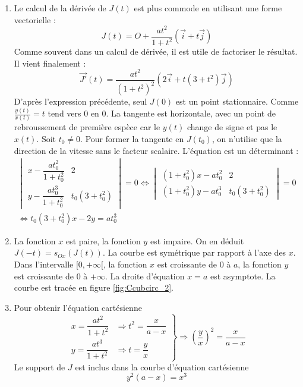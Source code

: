 \begin{enumerate}
\item Le calcul de la dérivée de $J(t)$ est plus commode en utilisant une forme vectorielle :
\begin{displaymath}
 J(t)=O + \dfrac{at^2}{1+t^2}\left( \overrightarrow{i}+t\overrightarrow{j}\right) 
\end{displaymath}
Comme souvent dans un calcul de dérivée, il est utile de factoriser le résultat. Il vient finalement :
\begin{displaymath}
 \overrightarrow{J'}(t)= \dfrac{at^2}{(1+t^2)^2}\left(2 \overrightarrow{i}+t(3+t^2)\overrightarrow{j}\right) 
\end{displaymath}
D'après l'expression précédente, seul $J(0)$ est un point stationnaire. Comme $\frac{y(t)}{x(t)}=t$ tend vers $0$ en $0$. La tangente est horizontale, avec un point de rebroussement de première espèce car le $y(t)$ change de signe et pas le $x(t)$.\newline
Soit $t_0\neq 0$. Pour former la tangente en $J(t_0)$, on n'utilise que la direction de la vitesse sans le facteur scalaire. L'équation est un déterminant :
\begin{multline*}
 \begin{vmatrix}
  x-\dfrac{at_0^2}{1+t_0^2} & 2 \\
y - \dfrac{at_0^3}{1+t_0^2} & t_0(3+t_0^2)
 \end{vmatrix}
=0
\Leftrightarrow
 \begin{vmatrix}
  (1+t_0^2)x-at_0^2 & 2 \\
  (1+t_0^2)y - at_0^3 & t_0(3+t_0^2)
 \end{vmatrix}
=0 \\
\Leftrightarrow
t_0(3+t_0^2)x - 2y =at_0^3
\end{multline*}

\item La fonction $x$ est paire, la fonction $y$ est impaire. On en déduit $J(-t)=s_{Ox}(J(t))$. La courbe est symétrique par rapport à l'axe des $x$. Dans l'intervalle $[0,+\infty[$, la fonction $x$ est croissante de $0$ à $a$, la fonction $y$ est croissante de $0$ à $+\infty$. La droite d'équation $x=a$ est asymptote. La courbe est tracée en figure \ref{fig:Ccubcirc_2}.
\item Pour obtenir l'équation cartésienne
\begin{displaymath}
\left. 
\begin{aligned}
 x= \dfrac{at^2}{1+t^2} &\Rightarrow t^2 = \dfrac{x}{a-x} \\
 y= \dfrac{at^3}{1+t^2} &\Rightarrow t = \dfrac{y}{x}
\end{aligned}
\right\rbrace  
\Rightarrow
\left( \dfrac{y}{x}\right)^2 =  \dfrac{x}{a-x} 
\end{displaymath}
Le support de $J$ est inclus dans la courbe d'équation cartésienne
\begin{displaymath}
 y^2(a-x)=x^3
\end{displaymath}
\end{enumerate}

